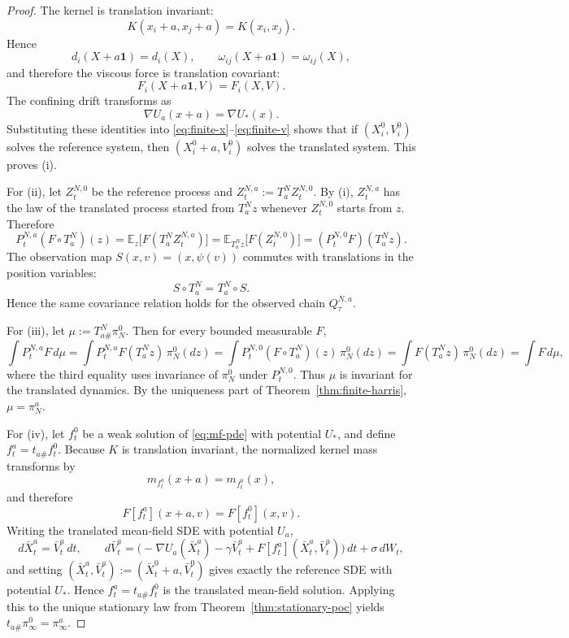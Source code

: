 \documentclass[11pt]{article}
\theoremstyle{definition}
\theoremstyle{remark}
\newcommand{\E}{\mathbb{E}}
\begin{document}
\begin{proof}
The kernel is translation invariant:
\[
K(x_i+a,x_j+a)=K(x_i,x_j).
\]
Hence
\[
d_i(X+a\mathbf 1)=d_i(X),
\qquad
\omega_{ij}(X+a\mathbf 1)=\omega_{ij}(X),
\]
and therefore the viscous force is translation covariant:
\[
F_i(X+a\mathbf 1,V)=F_i(X,V).
\]
The confining drift transforms as
\[
\nabla U_a(x+a)=\nabla U_*(x).
\]
Substituting these identities into \eqref{eq:finite-x}--\eqref{eq:finite-v}
shows that if \((X_i^0,V_i^0)\) solves the reference system, then
\((X_i^0+a,V_i^0)\) solves the translated system. This proves
\textnormal{(i)}.

For \textnormal{(ii)}, let \(Z_t^{N,0}\) be the reference process and
\(Z_t^{N,a}:=T_a^N Z_t^{N,0}\). By \textnormal{(i)}, \(Z_t^{N,a}\) has the law of
the translated process started from \(T_a^N z\) whenever \(Z_t^{N,0}\) starts
from \(z\). Therefore
\[
P_t^{N,a}(F\circ T_a^N)(z)
=
\E_z\!\bigl[F(T_a^N Z_t^{N,a})\bigr]
=
\E_{T_a^N z}\!\bigl[F(Z_t^{N,0})\bigr]
=
(P_t^{N,0}F)(T_a^N z).
\]
The observation map \(S(x,v)=(x,\psi(v))\) commutes with translations in the
position variables:
\[
S\circ T_a^N=T_a^N\circ S.
\]
Hence the same covariance relation holds for the observed chain \(Q_\tau^{N,a}\).

For \textnormal{(iii)}, let \(\mu:=T_{a\#}^N\pi_N^0\). Then for every bounded
measurable \(F\),
\[
\int P_t^{N,a}F\,d\mu
=
\int P_t^{N,a}F(T_a^N z)\,\pi_N^0(dz)
=
\int P_t^{N,0}(F\circ T_a^N)(z)\,\pi_N^0(dz)
=
\int F(T_a^N z)\,\pi_N^0(dz)
=
\int F\,d\mu,
\]
where the third equality uses invariance of \(\pi_N^0\) under \(P_t^{N,0}\).
Thus \(\mu\) is invariant for the translated dynamics. By the uniqueness part of
Theorem~\ref{thm:finite-harris}, \(\mu=\pi_N^a\).

For \textnormal{(iv)}, let \(f_t^0\) be a weak solution of \eqref{eq:mf-pde}
with potential \(U_*\), and define \(f_t^a=t_{a\#}f_t^0\). Because \(K\) is
translation invariant, the normalized kernel mass transforms by
\[
m_{f_t^a}(x+a)=m_{f_t^0}(x),
\]
and therefore
\[
F[f_t^a](x+a,v)=F[f_t^0](x,v).
\]
Writing the translated mean-field SDE with potential \(U_a\),
\[
d\bar X_t^a=\bar V_t^a\,dt,
\qquad
d\bar V_t^a=
\bigl(-\nabla U_a(\bar X_t^a)-\gamma \bar V_t^a+F[f_t^a](\bar X_t^a,\bar V_t^a)\bigr)\,dt
+\sigma\,dW_t,
\]
and setting \((\bar X_t^a,\bar V_t^a):=(\bar X_t^0+a,\bar V_t^0)\) gives exactly
the reference SDE with potential \(U_*\). Hence \(f_t^a=t_{a\#}f_t^0\) is the
translated mean-field solution. Applying this to the unique stationary law from
Theorem~\ref{thm:stationary-poc} yields \(t_{a\#}\pi_\infty^0=\pi_\infty^a\).


\end{proof}
\end{document}

